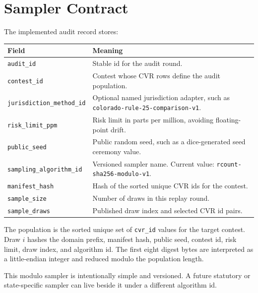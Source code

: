 \section{Sampler Contract}

The implemented audit record stores:

\begin{center}
\small
\begin{tabularx}{\textwidth}{lX}
\toprule
Field & Meaning \\
\midrule
\texttt{audit\_id} & Stable id for the audit round. \\
\texttt{contest\_id} & Contest whose CVR rows define the audit population. \\
\texttt{jurisdiction\_method\_id} & Optional named jurisdiction adapter, such as \texttt{colorado-rule-25-comparison-v1}. \\
\texttt{risk\_limit\_ppm} & Risk limit in parts per million, avoiding floating-point drift. \\
\texttt{public\_seed} & Public random seed, such as a dice-generated seed ceremony value. \\
\texttt{sampling\_algorithm\_id} & Versioned sampler name. Current value: \texttt{rcount-sha256-modulo-v1}. \\
\texttt{manifest\_hash} & Hash of the sorted unique CVR ids for the contest. \\
\texttt{sample\_size} & Number of draws in this replay round. \\
\texttt{sample\_draws} & Published draw index and selected CVR id pairs. \\
\bottomrule
\end{tabularx}
\end{center}

The population is the sorted unique set of \texttt{cvr\_id} values for the
target contest. Draw $i$ hashes the domain prefix, manifest hash, public seed,
contest id, risk limit, draw index, and algorithm id. The first eight digest
bytes are interpreted as a little-endian integer and reduced modulo the
population length.

This modulo sampler is intentionally simple and versioned. A future statutory
or state-specific sampler can live beside it under a different algorithm id.
